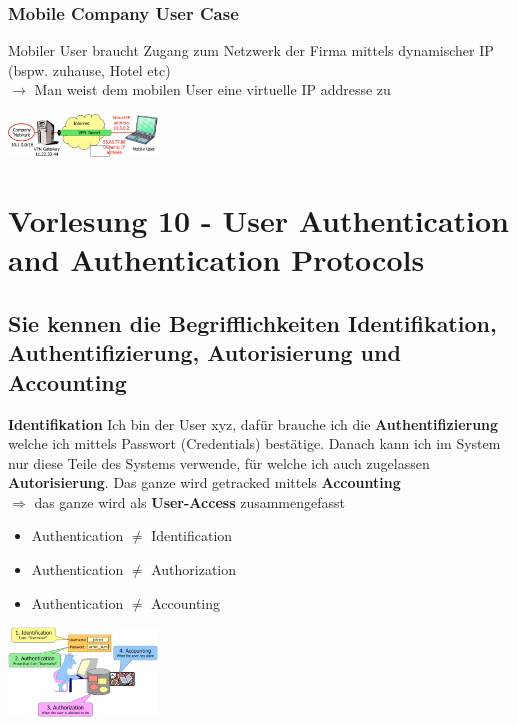 \documentclass{report}
\newenvironment{Figure}
	{\par\medskip\noindent\minipage{\linewidth}}
	{\endminipage\par\medskip}
\theoremstyle{definition}
\theoremstyle{example}
\begin{document}
	\subsection{Mobile Company User Case}
Mobiler User braucht Zugang zum Netzwerk der Firma mittels dynamischer IP (bspw. zuhause, Hotel etc)\\
$\rightarrow$ Man weist dem mobilen User eine virtuelle IP addresse zu 

\begin{Figure}
\centering
\includegraphics[width=150px]{img/VPNScenariosII.png}
	\label{fig:Abbildung eines möglichen VPN-Szenarios(2)}
\end{Figure}


\chapter{Vorlesung 10 - User Authentication and Authentication Protocols}

\section{Sie kennen die Begrifflichkeiten Identifikation, Authentifizierung, Autorisierung und Accounting}
\textbf{Identifikation} Ich bin der User xyz, dafür brauche ich die \textbf{Authentifizierung} welche ich mittels Passwort (Credentials) bestätige. 
Danach kann ich im System nur diese Teile des Systems verwende, für welche ich auch zugelassen \textbf{Autorisierung}. Das ganze wird getracked mittels \textbf{Accounting}\\
$\Rightarrow$ das ganze wird als \textbf{User-Access} zusammengefasst

\begin{itemize}
	\item Authentication $\neq$ Identification
	\item Authentication $\neq$ Authorization
	\item Authentication $\neq$ Accounting
\end{itemize}

\begin{Figure}
\centering
\includegraphics[width=150px]{img/Terminology.png}
	\label{fig:Abbildung der Terminologien}
\end{Figure}
\end{document}
